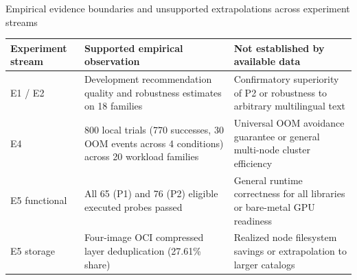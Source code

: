 \begin{table}[ht]{Empirical evidence boundaries and unsupported extrapolations across experiment streams}
\label{tab:evidence-boundaries}
\centering
\small
\begin{tabular}{p{2.8cm}p{5.4cm}p{5.8cm}}
\toprule
Experiment stream & Supported empirical observation & Not established by available data \\
\midrule
E1 / E2 & Development recommendation quality and robustness estimates on 18 families & Confirmatory superiority of P2 or robustness to arbitrary multilingual text \\
E4 & 800 local trials (770 successes, 30 OOM events across 4 conditions) across 20 workload families & Universal OOM avoidance guarantee or general multi-node cluster efficiency \\
E5 functional & All 65 (P1) and 76 (P2) eligible executed probes passed & General runtime correctness for all libraries or bare-metal GPU readiness \\
E5 storage & Four-image OCI compressed layer deduplication (27.61\% share) & Realized node filesystem savings or extrapolation to larger catalogs \\
\bottomrule
\end{tabular}
\end{table}
